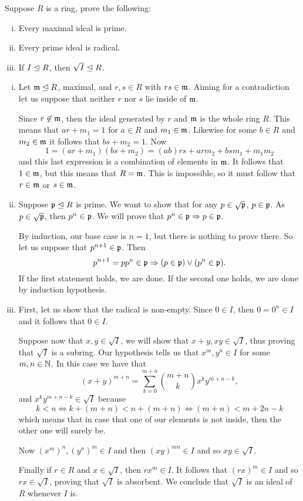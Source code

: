 \documentclass[12pt]{memoir}
\begin{document}
\begin{Ej}[2.1.1]
  Suppose $R$ is a ring, prove the following:
  \vspace{-0.4em}
  \begin{enumerate}[i)]
    \itemsep=-0.4em
    \item Every maximal ideal is prime.
    \item Every prime ideal is radical.
    \item If $I\trianglelefteq R$, then $\sqrt{I}\trianglelefteq R$.
  \end{enumerate}
\end{Ej}

\begin{ptcbr}
\begin{enumerate}[i)]
  \itemsep=-0.4em
    \item Let $\mathfrak{m}\trianglelefteq R$, maximal, and $r,s\in R$ with $rs\in\mathfrak{m}$. Aiming for a contradiction let us suppose that neither $r$ nor $s$ lie inside of $\mathfrak{m}$.\par 
    Since $r\not\in\mathfrak{m}$, then the ideal generated by $r$ and $\mathfrak{m}$ is the whole ring $R$. This means that $ar+m_1=1$ for $a\in R$ and $m_1\in\mathfrak{m}$. Likewise for some $b\in R$ and $m_2\in\mathfrak{m}$ it follows that $bs+m_2=1$. Now 
    $$1=(ar+m_1)(bs+m_2)=(ab)rs+arm_2+bsm_1+m_1m_2$$
    and this last expression is a combination of elements in $\mathfrak{m}$. It follows that $1\in\mathfrak{m}$, but this means that $R=\mathfrak{m}$. This is impossible, so it must follow that $r\in\mathfrak{m}$ or $s\in\mathfrak{m}$.
    \item Suppose $\mathfrak{p}\trianglelefteq R$ is prime. We want to show that for any $p\in\sqrt{\mathfrak{p}}$, $p\in\mathfrak{p}$. As $p\in\sqrt{\mathfrak{p}}$, then $p^n\in\mathfrak{p}$. We will prove that $p^n\in\mathfrak{p}\Rightarrow p\in\mathfrak{p}$.\par 
    By induction, our base case is $n=1$, but there is nothing to prove there. So let us suppose that $p^{n+1}\in\mathfrak{p}$. Then 
    $$p^{n+1}=pp^n\in\mathfrak{p}\Rightarrow (p\in\mathfrak{p})\lor(p^n\in\mathfrak{p}).$$
    If the first statement holds, we are done. If the second one holds, we are done by induction hypothesis.
    \item First, let us show that the radical is non-empty. Since $0\in I$, then $0=0^n\in I$ and it follows that $0\in I$.\par 
    Suppose now that $x,y\in\sqrt{I}$, we will show that $x+y, xy\in\sqrt{I}$, thus proving that $\sqrt I$ is a subring. Our hypothesis tells us that $x^m,y^n\in I$ for some $m,n\in\mathbb{N}$. In this case we have that
    $$(x+y)^{m+n}=\sum_{k=0}^{m+n}\binom{m+n}{k}x^ky^{m+n-k},$$
    and $x^ky^{m+n-k}\in\sqrt{I}$ because 
    $$k<n\iff k+(m+n)<n+(m+n)\iff (m+n)<m+2n-k$$
    which means that in case that one of our elements is not inside, then the other one will surely be. \par 
    Now $(x^m)^n,(y^n)^m\in I$ and then $(xy)^{mn}\in I$ and so $xy\in\sqrt{I}$.\par 
    Finally if $r\in R$ and $x\in\sqrt{I}$, then $rx^m\in I$. It follows that $(rx)^m\in I$ and so $rx\in\sqrt I$, proving that $\sqrt{I}$ is absorbent. We conclude that $\sqrt{I}$ is an ideal of $R$ whenever $I$ is.
\end{enumerate}
\end{ptcbr}
\end{document}
